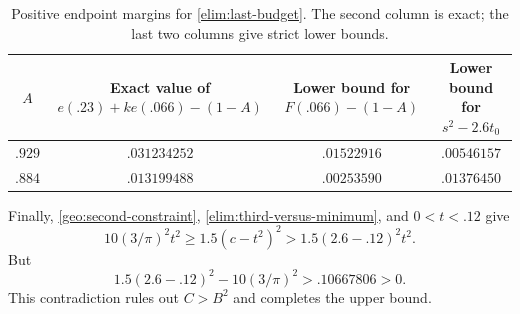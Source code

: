 \begin{table}[ht]
\centering
\begin{tabular}{c|c|c|c}
$A$ & \shortstack{Exact value of\\ $e(.23)+ke(.066)-(1-A)$} &
 \shortstack{Lower bound for\\ $F(.066)-(1-A)$} &
 \shortstack{Lower bound for\\ $s^2-2.6t_0$}\\
\hline
$.929$ & $.031234252$ & $.01522916$ & $.00546157$\\
$.884$ & $.013199488$ & $.00253590$ & $.01376450$
\end{tabular}
\caption{Positive endpoint margins for \eqref{elim:last-budget}.
The second column is exact; the last two columns give strict lower bounds.}
\label{elim:final-table}
\end{table}

Finally, \eqref{geo:second-constraint}, \eqref{elim:third-versus-minimum},
and $0<t<.12$ give
\[
 10(3/\pi)^2t^2
 \ge1.5(c-t^2)^2
 >1.5(2.6-.12)^2t^2.
\]
But
\[
 1.5(2.6-.12)^2-10(3/\pi)^2>.10667806>0.
\]
This contradiction rules out $C>B^2$ and completes the upper bound.
